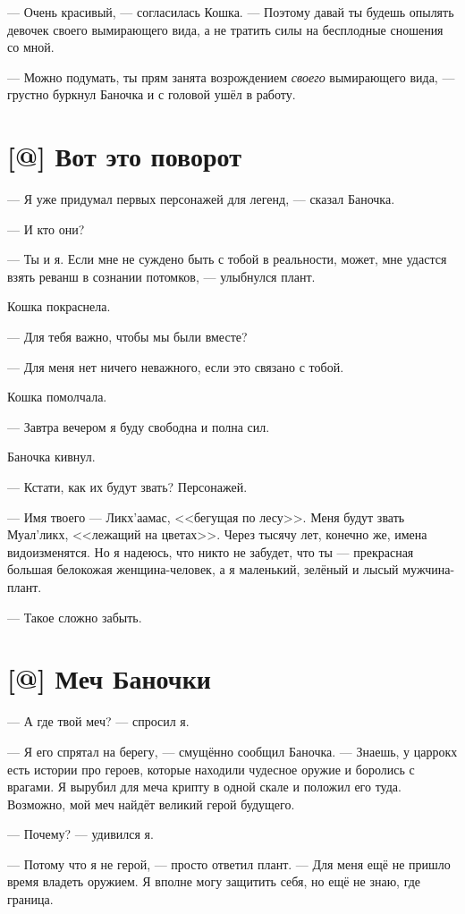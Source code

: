 --- Очень красивый, --- согласилась Кошка.
--- Поэтому давай ты будешь опылять девочек своего вымирающего вида, а не тратить силы на бесплодные сношения со мной.

--- Можно подумать, ты прям занята возрождением \emph{своего} вымирающего вида, --- грустно буркнул Баночка и с головой ушёл в работу.

\section{[@] Вот это поворот}

--- Я уже придумал первых персонажей для легенд, --- сказал Баночка.

--- И кто они?

--- Ты и я.
Если мне не суждено быть с тобой в реальности, может, мне удастся взять реванш в сознании потомков, --- улыбнулся плант.

Кошка покраснела.

--- Для тебя важно, чтобы мы были вместе?

--- Для меня нет ничего неважного, если это связано с тобой.

Кошка помолчала.

--- Завтра вечером я буду свободна и полна сил.

Баночка кивнул.

--- Кстати, как их будут звать?
Персонажей.

--- Имя твоего --- Ликх'аамас, <<бегущая по лесу>>.
Меня будут звать Муал'ликх, <<лежащий на цветах>>.
Через тысячу лет, конечно же, имена видоизменятся.
Но я надеюсь, что никто не забудет, что ты --- прекрасная большая белокожая женщина-человек, а я маленький, зелёный и лысый мужчина-плант.

--- Такое сложно забыть.

\section{[@] Меч Баночки}

--- А где твой меч? --- спросил я.

--- Я его спрятал на берегу, --- смущённо сообщил Баночка.
--- Знаешь, у царрокх есть истории про героев, которые находили чудесное оружие и боролись с врагами.
Я вырубил для меча крипту в одной скале и положил его туда.
Возможно, мой меч найдёт великий герой будущего.

--- Почему? --- удивился я.

--- Потому что я не герой, --- просто ответил плант.
--- Для меня ещё не пришло время владеть оружием.
Я вполне могу защитить себя, но ещё не знаю, где граница.

